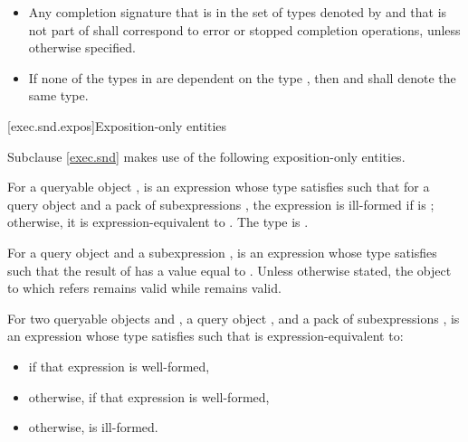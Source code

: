 \begin{itemize}
\item
Any completion signature
that is in the set of types
denoted by  and
that is not part of  shall correspond to
error or stopped completion operations,
unless otherwise specified.

\item
If none of the types in  are dependent on the type , then
 and
shall denote the same type.
\end{itemize}

[exec.snd.expos]{Exposition-only entities}

\pnum
Subclause \ref{exec.snd} makes use of the following exposition-only entities.

\pnum
{}%
For a queryable object ,
 is an expression
whose type satisfies 
such that for a query object  and
a pack of subexpressions ,
the expression  is ill-formed
if  is ;
otherwise, it is expression-equivalent to .
%
The type  is
.

\pnum
For a query object  and a subexpression ,
 is an expression 
whose type satisfies 
such that the result of  has
a value equal to .
Unless otherwise stated,
the object to which  refers remains valid
while  remains valid.

\pnum
For two queryable objects  and ,
a query object , and
a pack of subexpressions ,
 is an expression 
whose type satisfies 
such that  is expression-equivalent to:
\begin{itemize}
\item
{} if that expression is well-formed,
\item
otherwise,  if that expression is well-formed,
\item
otherwise,  is ill-formed.
\end{itemize}

